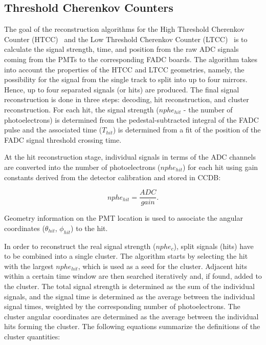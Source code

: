 \subsection{Threshold Cherenkov Counters}

The goal of the reconstruction algorithms for the High Threshold Cherenkov Counter (HTCC)~\cite{htcc-nim} and
the Low Threshold Cherenkov Counter (LTCC)~\cite{ltcc-nim} is to calculate the signal strength, time, and position
from the raw ADC signals coming from the PMTs to the corresponding FADC boards. The algorithm takes into
account the properties of the HTCC and LTCC geometries, namely, the possibility for the signal from the single
track to split into up to four mirrors. Hence, up to four separated signals (or hits) are produced. The final signal
reconstruction is done in three steps: decoding, hit reconstruction, and cluster reconstruction. For each hit,
the signal strength ($nphe_{hit}$ - the number of photoelectrons) is determined from the pedestal-subtracted
integral of the FADC pulse and the associated time ($T_{hit}$) is determined from a fit of the position of the FADC
signal threshold crossing time.

At the hit reconstruction stage, individual signals in terms of the ADC channels are converted into the number of
photoelectrons ($nphe_{hit}$) for each hit using gain constants derived from the detector calibration and stored
in CCDB:

\begin{equation}
nphe_{hit} = \frac{ADC}{gain}.
\end{equation}

\noindent
Geometry information on the PMT location is used to associate the angular coordinates ($\theta_{hit}$, $\phi_{hit}$)
to the hit.

In order to reconstruct the real signal strength ($nphe_c$), split signals (hits) have to be combined into a single
cluster. The algorithm starts by selecting the hit with the largest $nphe_{hit}$, which is used as a seed for the
cluster. Adjacent hits within a certain time window are then searched iteratively and, if found, added to the
cluster. The total signal strength is determined as the sum of the individual signals, and the signal time is
determined as the average between the individual signal times, weighted by the corresponding number of
photoelectrons. The cluster angular coordinates are determined as the average between the individual hits forming
the cluster. The following equations summarize the definitions of the cluster quantities:

